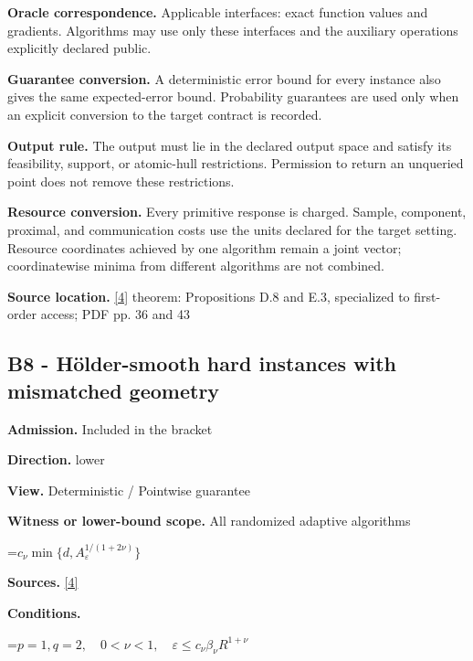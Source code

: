 \documentclass[10pt,a4paper]{article}
\newcommand{\AtlasMath}[1]{\par\begingroup\centering\setbox0=\hbox{$\displaystyle #1$}\ifdim\wd0>1.4\linewidth\typeout{ATLAS WIDE FORMULA: \the\wd0}\fi\ifdim\wd0>\linewidth\resizebox{\linewidth}{!}{\box0}\else\box0\fi\par\endgroup}
\begin{document}
\textbf{Oracle correspondence.} Applicable interfaces: exact function values and gradients. Algorithms may use only these interfaces and the auxiliary operations explicitly declared public.



\textbf{Guarantee conversion.} A deterministic error bound for every instance also gives the same expected-error bound. Probability guarantees are used only when an explicit conversion to the target contract is recorded.



\textbf{Output rule.} The output must lie in the declared output space and satisfy its feasibility, support, or atomic-hull restrictions. Permission to return an unqueried point does not remove these restrictions.



\textbf{Resource conversion.} Every primitive response is charged. Sample, component, proximal, and communication costs use the units declared for the target setting. Resource coordinates achieved by one algorithm remain a joint vector; coordinatewise minima from different algorithms are not combined.



\textbf{Source location.} \href{https://arxiv.org/pdf/2609.32910}{[4]} theorem: Propositions D.8 and E.3, specialized to first-order access; PDF pp. 36 and 43



\subsection{B8 - Hölder-smooth hard instances with mismatched geometry}


\textbf{Admission.} Included in the bracket



\textbf{Direction.} lower



\textbf{View.} Deterministic / Pointwise guarantee



\textbf{Witness or lower-bound scope.} All randomized adaptive algorithms



\AtlasMath{c_\nu\min\{d,A_\varepsilon^{1/(1+2\nu)}\}}


\textbf{Sources.} \href{https://arxiv.org/pdf/2609.32910}{[4]}



\textbf{Conditions.}
\AtlasMath{p=1,q=2,\quad0<\nu<1,\quad\varepsilon\le c_\nu\beta_\nu R^{1+\nu}}
\end{document}
